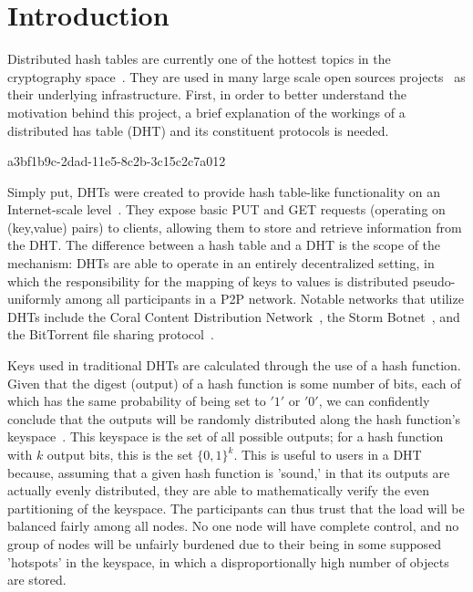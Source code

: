 \documentclass[12pt]{article}
\begin{document}
\section{Introduction}
\par Distributed hash tables are currently one of the hottest topics in the cryptography space~\cite{Stoica:2001dj,Rowstron:2001ea,Ratnasamy:2001wn}. They are used in many large scale open sources projects~\cite{Freitas:2013tb,Xu:2010vs,Perfitt:2010fh} as their underlying infrastructure. First, in order to better understand the motivation behind this project, a brief explanation of the workings of a distributed has table (DHT) and its constituent protocols is needed.

a3bf1b9c-2dad-11e5-8c2b-3c15c2c7a012\par Simply put, DHTs were created to provide hash table-like functionality on an Internet-scale level~\cite{Ratnasamy:2001wn}. They expose basic PUT and GET requests (operating on (key,value) pairs) to clients, allowing them to store and retrieve information from the DHT. The difference between a hash table and a DHT is the scope of the mechanism: DHTs are able to operate in an entirely decentralized setting, in which the responsibility for the mapping of keys to values is distributed pseudo-uniformly among all participants in a P2P network. Notable networks that utilize DHTs include the Coral Content Distribution Network~\cite{Freedman:2004vb}, the Storm Botnet~\cite{Holz:2008uk}, and the BitTorrent file sharing protocol~\cite{Cohen:y1_8mBnw}.

\par Keys used in traditional DHTs are calculated through the use of a hash function. Given that the digest (output) of a hash function is some number of bits, each of which has the same probability of being set to $'1'$ or $'0'$, we can confidently conclude that the outputs will be randomly distributed along the hash function's keyspace~. This keyspace is the set of all possible outputs; for a hash function with $k$ output bits, this is the set $\{0,1\}^k$. This is useful to users in a DHT because, assuming that a given hash function is 'sound,' in that its outputs are actually evenly distributed, they are able to mathematically verify the even partitioning of the keyspace. The participants can thus trust that the load will be balanced fairly among all nodes. No one node will have complete control, and no group of nodes will be unfairly burdened due to their being in some supposed 'hotspots' in the keyspace, in which a disproportionally high number of objects are stored.~
\end{document}
